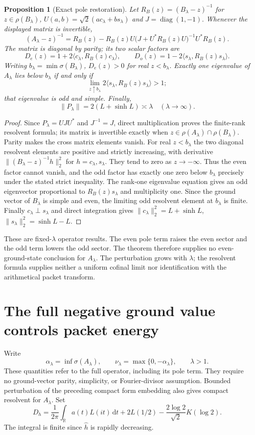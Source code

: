 \documentclass[11pt]{article}
\newtheorem{proposition}[theorem]{Proposition}
\theoremstyle{remark}\newtheorem{remark}[theorem]{Remark}
\newcommand{\R}{\mathbb R}
\newcommand{\dd}{\,\mathrm d}
\begin{document}
\begin{proposition}[Exact pole restoration]\label{prop:pole-restoration}
Let $R_B(z)=(B_\lambda-z)^{-1}$ for $z\in\rho(B_\lambda)$,
$U(a,b)=\sqrt2(ac_\lambda+bs_\lambda)$ and
$J=\operatorname{diag}(1,-1)$. Whenever the displayed
matrix is invertible,
\[
 (A_\lambda-z)^{-1}
 =R_B(z)-R_B(z)U\bigl(J+U^*R_B(z)U\bigr)^{-1}U^*R_B(z).
\]
The matrix is diagonal by parity; its two scalar factors are
\[
 D_e(z)=1+2\langle c_\lambda,R_B(z)c_\lambda\rangle,
 \qquad D_o(z)=1-2\langle s_\lambda,R_B(z)s_\lambda\rangle.
\]
Writing $b_\lambda=\min\sigma(B_\lambda)$, $D_e(z)>0$ for
real $z<b_\lambda$. Exactly one eigenvalue of $A_\lambda$
lies below $b_\lambda$ if and only if
\[
 \lim_{z\uparrow b_\lambda}
         2\langle s_\lambda,R_B(z)s_\lambda\rangle>1;
\]
that eigenvalue is odd and simple. Finally,
\[
 \|P_\lambda\|=2(L+\sinh L)\asymp\lambda
                       \quad(\lambda\to\infty).
\]
\end{proposition}
\begin{proof}
Since $P_\lambda=UJU^*$ and $J^{-1}=J$, direct
multiplication proves the finite-rank resolvent formula;
its matrix is invertible exactly when
$z\in\rho(A_\lambda)\cap\rho(B_\lambda)$.
Parity makes the cross matrix elements vanish.
For real $z<b_\lambda$ the two diagonal resolvent elements
are positive and strictly increasing, with derivative
$\|(B_\lambda-z)^{-1}h\|_2^2$ for $h=c_\lambda,s_\lambda$.
They tend to zero as $z\to-\infty$. Thus the even factor
cannot vanish, and the odd factor has exactly one zero
below $b_\lambda$ precisely under the stated strict inequality.
The rank-one eigenvalue equation gives an odd eigenvector
proportional to $R_B(z)s_\lambda$ and multiplicity one.
Since the ground vector of $B_\lambda$ is simple and even,
the limiting odd resolvent element at $b_\lambda$ is finite.
Finally $c_\lambda\perp s_\lambda$ and direct integration gives
$\|c_\lambda\|_2^2=L+\sinh L$,
$\|s_\lambda\|_2^2=\sinh L-L$.
\end{proof}

These are fixed-$\lambda$ operator results. The even pole term
raises the even sector and the odd term lowers the odd sector.
The theorem therefore supplies no even-ground-state conclusion
for $A_\lambda$. The perturbation grows with $\lambda$;
the resolvent formula supplies neither a uniform cofinal limit
nor identification with the arithmetical packet transform.

\section{The full negative ground value controls packet energy}
Write
\[
 \alpha_\lambda=\inf\sigma(A_\lambda),\qquad
 \nu_\lambda=\max\{0,-\alpha_\lambda\},\qquad \lambda>1.
\]
These quantities refer to the full operator, including its pole term.
They require no ground-vector parity, simplicity, or Fourier-divisor
assumption. Bounded perturbation of the preceding compact form
embedding also gives compact resolvent for $A_\lambda$.
Set
\[
 D_h=\frac1{2\pi}\int_{\R}a(t)L(it)\dd t
          +2L(1/2)-\frac{2\log2}{\sqrt2}K(\log2).
\]
The integral is finite since $\widehat h$ is rapidly decreasing.
\end{document}

